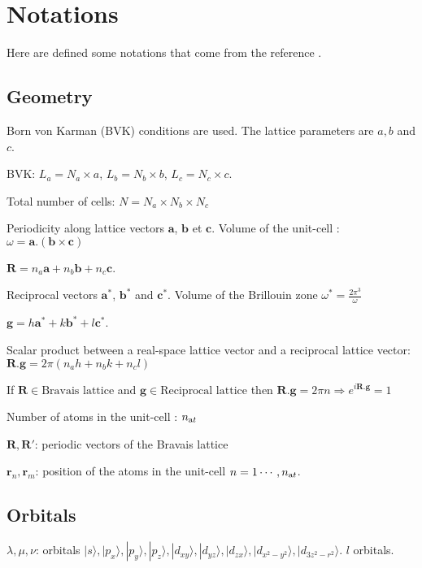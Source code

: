 \documentclass{article}
\newcommand{\ket}[1]{|#1\rangle}
\begin{document}
\section{Notations}
Here are defined some notations that come from the reference \cite{barreteauEfficientMagneticTightbinding2016}.

\subsection{Geometry}
\label{sec:Geometry}
\noindent
Born von Karman (BVK) conditions are used.
The lattice parameters are $a,b$ and $c$.

\noindent
BVK: $L_a=N_a \times a$,\; $L_b=N_b \times b$,\; $L_c=N_c \times c$.

\noindent
Total number of cells: $N=N_a \times N_b \times N_c$

\noindent
Periodicity along lattice vectors $\mathbf a$, $\mathbf b$ et $\mathbf c$. 
Volume of the unit-cell : $\omega=\mathbf{a}.(\mathbf{b} \times \mathbf{c})$

$\mathbf{R}=n_a \mathbf{a}+n_b \mathbf{b}+n_c \mathbf{c}$.

\noindent
Reciprocal vectors  $\mathbf{a}^*$, $\mathbf{b}^*$ and $\mathbf{c}^*$. Volume of the Brillouin zone $\omega^*=\displaystyle{\frac{2\pi^3}{\omega}}$

$\mathbf{g}= h \mathbf{a}^*+k \mathbf{b}^*+l \mathbf{c}^*$.

\noindent
Scalar product between a real-space lattice vector and a reciprocal lattice vector: $\mathbf{R}.\mathbf{g}=2\pi(n_ah+n_bk+n_cl)$

\noindent
If $\mathbf{R} \in \text{Bravais lattice}$ and $\mathbf{g} \in \text{Reciprocal lattice}$ then $\mathbf{R}.\mathbf{g}=2\pi n \Rightarrow e^{i\mathbf{R}.\mathbf{g}}=1$

\noindent
Number of atoms in the unit-cell : $n_{\text at}$

\noindent
$\mathbf{R}, \mathbf{R}'$: periodic vectors of the Bravais lattice

\noindent $\mathbf{r}_n,\mathbf{r}_m$: position of the atoms in the unit-cell $n=1\cdots, n_{\text at}$.


\subsection{Orbitals}
\label{sec:orbitals}

\noindent
$\lambda, \mu, \nu$: orbitals 
$\ket{s},\ket{p_x},\ket{p_y},\ket{p_z},
\ket{d_{xy}},\ket{d_{yz}},\ket{d_{zx}},\ket{d_{x^2-y^2}},\ket{d_{3z^2-r^2}}$. $l$ orbitals.
\end{document}
